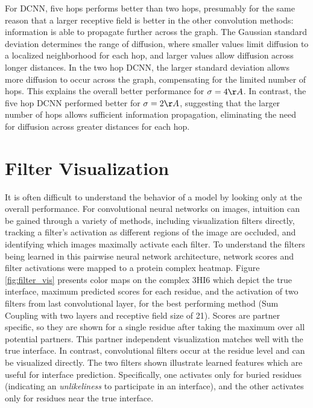 For DCNN, five hops performs better than two hops, presumably for the same reason that a larger receptive field is better in the other convolution methods: information is able to propagate further across the graph.
The Gaussian standard deviation determines the range of diffusion, where smaller values limit diffusion to a localized neighborhood for each hop, and larger values allow diffusion across longer distances.
In the two hop DCNN, the larger standard deviation allows more diffusion to occur across the graph, compensating for the limited number of hops.
This explains the overall better performance for $\sigma=4\AA{}$.
In contrast, the five hop DCNN performed better for $\sigma=2\AA{}$, suggesting that the larger number of hops allows sufficient information propagation, eliminating the need for diffusion across greater distances for each hop.





\section{Filter Visualization}

It is often difficult to understand the behavior of a model by looking only at the overall performance. 
For convolutional neural networks on images, intuition can be gained through a variety of methods, including visualization filters directly, tracking a filter's activation as different regions of the image are occluded, and identifying which images maximally activate each filter. 
To understand the filters being learned in this pairwise neural network architecture, network scores and filter activations were mapped to a protein complex heatmap.
Figure \ref{fig:filter_vis} presents color maps on the complex 3HI6 which depict the true interface, maximum predicted scores for each residue, and the activation of two filters from last convolutional layer, for the best performing method (Sum Coupling with two layers and receptive field size of 21).
Scores are partner specific, so they are shown for a single residue after taking the maximum over all potential partners.
This partner independent visualization matches well with the true interface.
In contrast, convolutional filters occur at the residue level and can be visualized directly. 
The two filters shown illustrate learned features which are useful for interface prediction.
Specifically, one activates only for buried residues (indicating an \emph{unlikeliness} to participate in an interface), and the other activates only for residues near the true interface.

